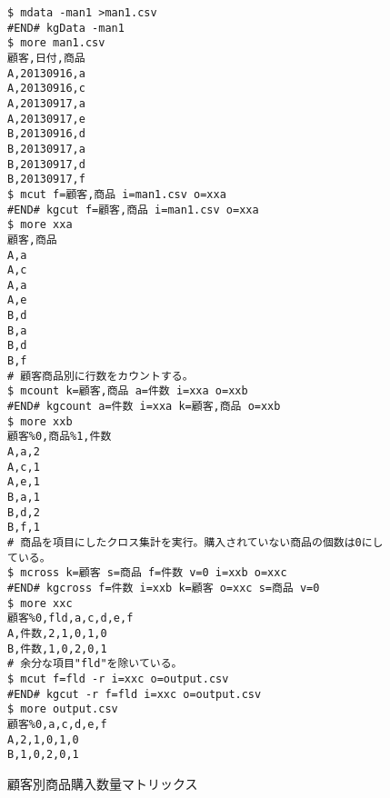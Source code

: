 \begin{figure}[htbp]
\begin{Verbatim}[baselinestretch=0.7,frame=single]
$ mdata -man1 >man1.csv
#END# kgData -man1
$ more man1.csv
顧客,日付,商品
A,20130916,a
A,20130916,c
A,20130917,a
A,20130917,e
B,20130916,d
B,20130917,a
B,20130917,d
B,20130917,f
$ mcut f=顧客,商品 i=man1.csv o=xxa
#END# kgcut f=顧客,商品 i=man1.csv o=xxa
$ more xxa
顧客,商品
A,a
A,c
A,a
A,e
B,d
B,a
B,d
B,f
# 顧客商品別に行数をカウントする。
$ mcount k=顧客,商品 a=件数 i=xxa o=xxb
#END# kgcount a=件数 i=xxa k=顧客,商品 o=xxb
$ more xxb
顧客%0,商品%1,件数
A,a,2
A,c,1
A,e,1
B,a,1
B,d,2
B,f,1
# 商品を項目にしたクロス集計を実行。購入されていない商品の個数は0にしている。
$ mcross k=顧客 s=商品 f=件数 v=0 i=xxb o=xxc
#END# kgcross f=件数 i=xxb k=顧客 o=xxc s=商品 v=0
$ more xxc
顧客%0,fld,a,c,d,e,f
A,件数,2,1,0,1,0
B,件数,1,0,2,0,1
# 余分な項目"fld"を除いている。
$ mcut f=fld -r i=xxc o=output.csv
#END# kgcut -r f=fld i=xxc o=output.csv
$ more output.csv
顧客%0,a,c,d,e,f
A,2,1,0,1,0
B,1,0,2,0,1
\end{Verbatim}
\caption{顧客別商品購入数量マトリックス\label{fig:abstract2_1}}
\end{figure}
